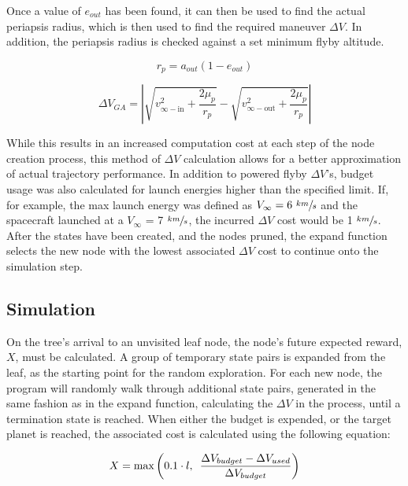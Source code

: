 \documentclass[letterpaper, preprint, paper,11pt]{AAS}	%
\begin{document}
Once a value of $e_{out}$ has been found, it can then be used to find the actual periapsis radius, which is then used to find the required maneuver $\Delta V$. In addition, the periapsis radius is checked against a set minimum flyby altitude.

\begin{equation}
    r_p = a_{out}(1 - e_{out})
\end{equation}

\begin{equation}
    \Delta V_{GA} = \left| \sqrt{ v^2_{\infty-\text{in}} + \frac{2\mu_p}{r_p} } - \sqrt{ v^2_{\infty-\text{out}} + \frac{2\mu_p}{r_p} } \right|
\end{equation}

While this results in an increased computation cost at each step of the node creation process, this method of $\Delta V$ calculation allows for a better approximation of actual trajectory performance. In addition to powered flyby $\Delta V$'s, budget usage was also calculated for launch energies higher than the specified limit. If, for example, the max launch energy was defined as $V_\infty = 6 \text{ }\sfrac{km}{s}$ and the spacecraft launched at a $V_\infty$ = 7 $\sfrac{km}{s}$, the incurred $\Delta V$ cost would be 1 $\sfrac{km}{s}$. After the states have been created, and the nodes pruned, the expand function selects the new node with the lowest associated $\Delta V$ cost to continue onto the simulation step.

\subsection{Simulation}

On the tree's arrival to an unvisited leaf node, the node's future expected reward, $X$, must be calculated. A group of temporary state pairs is expanded from the leaf, as the starting point for the random exploration. For each new node, the program will randomly walk through additional state pairs, generated in the same fashion as in the expand function, calculating the $\Delta V$ in the process, until a termination state is reached. When either the budget is expended, or the target planet is reached, the associated cost is calculated using the following equation:

\begin{equation}
    \label{eq:simCost1}
    X = \text{max}\left( 0.1 \cdot l,\hspace{0.5em} \frac{\Delta V_{budget} - \Delta V_{used}}{\Delta V_{budget}} \right)
\end{equation}
\end{document}
